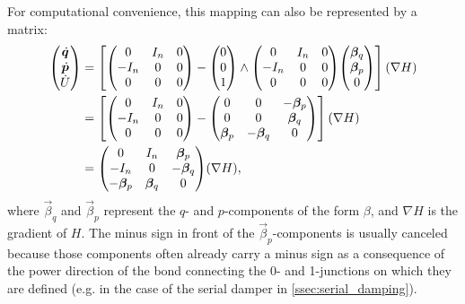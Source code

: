 For computational convenience, this mapping can also be represented by a matrix: 
\begin{equation}
    \begin{split}
        \mqty(\dot{\vec{q}} \\ \dot{\vec{p}} \\ \dot{U}) 
              &= \qty[\mqty( 0 & I_n & 0 \\  -I_n & 0 & 0 \\ 0 & 0 & 0) 
                - \mqty(0 \\ 0 \\ 1) \wedge \mqty( 0 & I_n & 0 \\  -I_n & 0 & 0 \\ 0 & 0 & 0) \mqty(\vec{\beta}_{q} \\ \vec{\beta}_{p}\\0)](\nabla H) \\
              &= \qty[\mqty( 0 & I_n & 0 \\  -I_n & 0 & 0 \\ 0 & 0 & 0) 
                 - \mqty(0 & 0 & -\vec{\beta}_p \\ 0 & 0 & \vec{\beta}_q \\ \vec{\beta}_p &  -\vec{\beta}_q & 0 )](\nabla H) \\
              &= \mqty( 0 & I_n & \vec{\beta}_p \\  -I_n & 0 & -\vec{\beta}_q \\ -\vec{\beta}_p & \vec{\beta}_q & 0)(\nabla H),
    \end{split}
    \label{eq:matrix_jacobi_mapping}
\end{equation}
where \(\vec{\beta}_q\) and \(\vec{\beta}_p\) represent the \(q\)- and \(p\)-components of the form \(\beta\), and \(\nabla H\) is the gradient of \(H\). The minus sign in front of the \(\vec{\beta}_p\)-components is usually canceled because those components often already carry a minus sign as a consequence of the power direction of the bond connecting the 0- and 1-junctions on which they are defined (e.g. in the case of the serial damper in \cref{ssec:serial_damping}).

